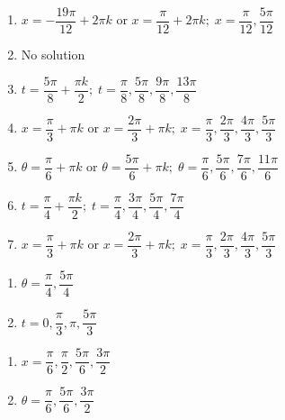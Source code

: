 \documentclass{ximera}
\begin{document}
\begin{enumerate}
\item $x = -\dfrac{19\pi}{12} + 2\pi k$ or $x = \dfrac{\pi}{12} + 2\pi k; \; x = \dfrac{\pi}{12}, \dfrac{5\pi}{12}$

\item No solution

\item $t = \dfrac{5\pi}{8} + \dfrac{\pi k}{2}; \; t = \dfrac{\pi}{8}, \dfrac{5\pi}{8}, \dfrac{9\pi}{8}, \dfrac{13\pi}{8}$

\item $x = \dfrac{\pi}{3} + \pi k$ or $x = \dfrac{2\pi}{3} + \pi k; \; x = \dfrac{\pi}{3}, \dfrac{2\pi}{3}, \dfrac{4\pi}{3}, \dfrac{5\pi}{3}$

\item $\theta  = \dfrac{\pi}{6} + \pi k$ or $\theta = \dfrac{5\pi}{6} + \pi k; \; \theta = \dfrac{\pi}{6}, \dfrac{5\pi}{6}, \dfrac{7\pi}{6}, \dfrac{11\pi}{6}$

\item $t = \dfrac{\pi}{4} + \dfrac{\pi k}{2}; \; t = \dfrac{\pi}{4}, \dfrac{3\pi}{4}, \dfrac{5\pi}{4}, \dfrac{7\pi}{4}$

\item $x = \dfrac{\pi}{3} + \pi k$ or $x = \dfrac{2\pi}{3} + \pi k; \; x = \dfrac{\pi}{3}, \dfrac{2\pi}{3}, \dfrac{4\pi}{3}, \dfrac{5\pi}{3}$

\setcounter{HW}{\value{enumi}}

\end{enumerate}

\begin{multicols}{2}

\begin{enumerate}

\setcounter{enumi}{\value{HW}}

\item $\theta = \dfrac{\pi}{4}, \dfrac{5\pi}{4}$
\item $t = 0, \dfrac{\pi}{3}, \pi, \dfrac{5\pi}{3}$

\setcounter{HW}{\value{enumi}}

\end{enumerate}

\end{multicols}

\begin{multicols}{2}

\begin{enumerate}

\setcounter{enumi}{\value{HW}}

\item $x = \dfrac{\pi}{6}, \dfrac{\pi}{2}, \dfrac{5\pi}{6}, \dfrac{3\pi}{2}$
\item $\theta = \dfrac{\pi}{6}, \dfrac{5\pi}{6}, \dfrac{3\pi}{2}$

\setcounter{HW}{\value{enumi}}

\end{enumerate}

\end{multicols}
\end{document}
